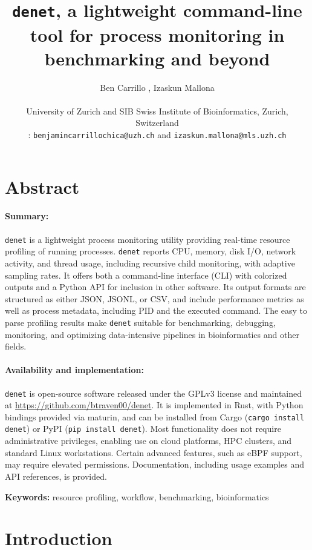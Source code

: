 \documentclass[10pt]{article}
\title{\texttt{denet}, a lightweight command-line tool for process monitoring in benchmarking and beyond}
\author{Ben Carrillo \orcidlink{0009-0003-5704-4151}, Izaskun Mallona \orcidlink{0000-0002-2853-7526}\\
\\
University of Zurich and SIB Swiss Institute of Bioinformatics, Zurich, Switzerland \\ 
{ \Letter: \texttt{benjamincarrillochica@uzh.ch} and \texttt{izaskun.mallona@mls.uzh.ch}}
}
\date{}
\renewcommand{\label}[1]{\gdef\labelname{##1}}%
\begin{document}
\maketitle
	
\section*{Abstract} %

\paragraph{Summary:} \texttt{denet} is a lightweight process monitoring utility providing real-time resource profiling of running processes. \texttt{denet} reports CPU, memory, disk I/O, network activity, and thread usage, including recursive child monitoring, with adaptive sampling rates. It offers both a command-line interface (CLI) with colorized outputs and a Python API for inclusion in other software. Its output formats are structured as either JSON, JSONL, or CSV, and include performance metrics as well as process metadata, including PID and the executed command. The easy to parse profiling results make \texttt{denet} suitable for benchmarking, debugging, monitoring, and optimizing data-intensive pipelines in bioinformatics and other fields. 

\paragraph{Availability and implementation:} \texttt{denet} is open-source software released under the GPLv3 license and maintained at \url{https://github.com/btraven00/denet}. It is implemented in Rust, with Python bindings provided via maturin, and can be installed from Cargo (\texttt{cargo install denet}) or PyPI (\texttt{pip install denet}). Most functionality does not require administrative privileges, enabling use on cloud platforms, HPC clusters, and standard Linux workstations. Certain advanced features, such as eBPF support, may require elevated permissions. Documentation, including usage examples and API references, is provided.

\vspace{0.5cm}

\noindent\textbf{Keywords:} resource profiling, workflow, benchmarking, bioinformatics

\section*{Introduction}  %
\label{sec:intro}
\end{document}
